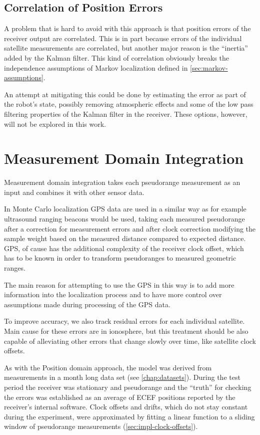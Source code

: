 \subsection{Correlation of Position Errors}
\label{sec:position-domain-correlation}
A problem that is hard to avoid with this approach is that position errors of the
receiver output are correlated.
This is in part because errors of the individual satellite measurements are correlated,
but another major reason
is the \enquote{inertia} added by the Kalman filter.
This kind of correlation obviously breaks the independence assumptions of Markov
localization defined in \cref{sec:markov-assumptions}.

An attempt at mitigating this could be done by estimating the error as part of
the robot's state, possibly removing atmospheric effects and some of the low pass
filtering properties of the Kalman filter in the receiver.
These options, however, will not be explored in this work.

\section{Measurement Domain Integration}
\label{sec:measurement-domain}

Measurement domain integration takes each pseudorange measurement as an input
and combines it with other sensor data.

In Monte Carlo localization GPS data are used in a similar way as
for example ultrasound ranging beacons would be used,
taking each measured pseudorange after a correction for measurement errors
and after clock correction modifying the sample weight based on the measured distance
compared to expected distance.
GPS, of cause has the additional complexity of the receiver clock offset, which
has to be known in order to transform pseudoranges to measured geometric ranges.

The main reason for attempting to use the GPS in this way is to add more information
into the localization process and to have more control over assumptions made during
processing of the GPS data.

To improve accuracy, we also track residual errors for each individual satellite.
Main cause for these errors are in ionosphere, but this treatment should be also
capable of alleviating other errors that change slowly over time, like satellite
clock offsets.

As with the Position domain approach, the model was derived from
measurements in a month long data set (see \cref{chap:datasets}).
During the test period the receiver was stationary and pseudorange and
the \enquote{truth} for checking the errors was established as an average of ECEF
positions reported by the receiver's internal software.
Clock offsets and drifts, which do not stay constant during the experiment,
were approximated by fitting a linear function to a sliding window of pseudorange
measurements (\cref{sec:impl-clock-offsets}).

